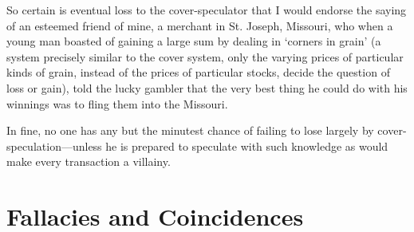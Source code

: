 \documentclass[letterpaper,12pt,oneside,openany]{memoir}
\begin{document}
So certain is eventual loss to the cover-speculator
that I would endorse the saying of an esteemed friend
of mine, a merchant in St. Joseph, Missouri, who when
a young man boasted of gaining a large sum by dealing
in `corners in grain' (a system precisely similar to the
cover system, only the varying prices of particular kinds
of grain, instead of the prices of particular stocks, decide
the question of loss or gain), told the lucky gambler that
the very best thing he could do with his winnings was
to fling them into the Missouri.

In fine, no one has any but the minutest chance of
failing to lose largely by cover-speculation---unless he is
prepared to speculate with such knowledge as would
make every transaction a villainy.

\chapter{Fallacies and Coincidences}
\end{document}
